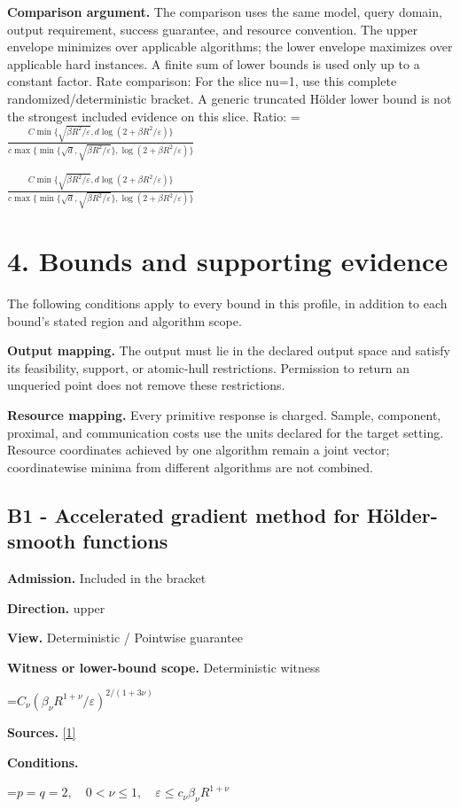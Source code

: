 \documentclass[10pt,a4paper]{article}
\newcommand{\AtlasMath}[1]{\par\begingroup\centering\setbox0=\hbox{$\displaystyle #1$}\ifdim\wd0>1.4\linewidth\typeout{ATLAS WIDE FORMULA: \the\wd0}\fi\ifdim\wd0>\linewidth\resizebox{\linewidth}{!}{\box0}\else\box0\fi\par\endgroup}
\newcommand{\AtlasInlineMath}[1]{\begingroup\setbox0=\hbox{$#1$}\ifdim\wd0>.4\linewidth\endgroup\AtlasMath{#1}\else\endgroup$#1$\fi}
\begin{document}
\textbf{Comparison argument.} The comparison uses the same model, query domain, output requirement, success guarantee, and resource convention. The upper envelope minimizes over applicable algorithms; the lower envelope maximizes over applicable hard instances. A finite sum of lower bounds is used only up to a constant factor. Rate comparison: For the slice nu=1, use this complete randomized/deterministic bracket. A generic truncated Hölder lower bound is not the strongest included evidence on this slice. Ratio: \AtlasInlineMath{\frac{C\min\{\sqrt{\beta R^2/\varepsilon},d\log(2+\beta R^2/\varepsilon)\}}{c\max\{\min\{\sqrt d,\sqrt{\beta R^2/\varepsilon}\},\log(2+\beta R^2/\varepsilon)\}}}

\section{4. Bounds and supporting evidence}
The following conditions apply to every bound in this profile, in addition to each bound's stated region and algorithm scope.

\textbf{Output mapping.} The output must lie in the declared output space and satisfy its feasibility, support, or atomic-hull restrictions. Permission to return an unqueried point does not remove these restrictions.

\textbf{Resource mapping.} Every primitive response is charged. Sample, component, proximal, and communication costs use the units declared for the target setting. Resource coordinates achieved by one algorithm remain a joint vector; coordinatewise minima from different algorithms are not combined.

\subsection{B1 - Accelerated gradient method for Hölder-smooth functions}
\textbf{Admission.} Included in the bracket

\textbf{Direction.} upper

\textbf{View.} Deterministic / Pointwise guarantee

\textbf{Witness or lower-bound scope.} Deterministic witness

\AtlasMath{C_\nu(\beta_\nu R^{1+\nu}/\varepsilon)^{2/(1+3\nu)}}
\textbf{Sources.} \href{https://optimization-online.org/wp-content/uploads/2010/12/2865.pdf}{[1]}

\textbf{Conditions.} 
\AtlasMath{p=q=2,\quad0<\nu\le1,\quad\varepsilon\le c_\nu\beta_\nu R^{1+\nu}}
\end{document}
